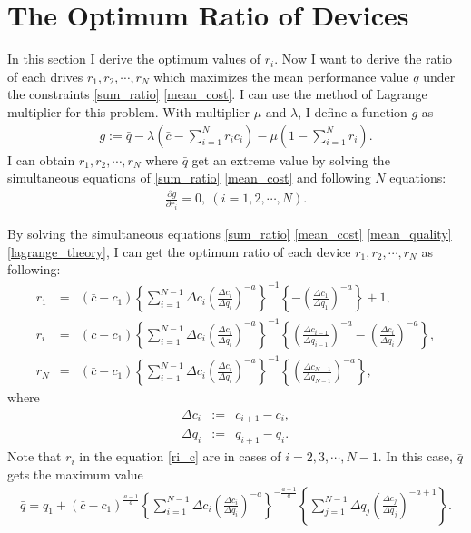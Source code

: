 \documentclass[a4paper,11pt]{article}
\begin{document}
\section{The Optimum Ratio of Devices}


In this section I derive the optimum values of $r_i$.
Now I want to derive the ratio of each drives $r_1, r_2, \cdots, r_N$
which maximizes the mean performance value $\bar{q}$ under the
constraints \eqref{sum_ratio} \eqref{mean_cost}.
I can use the method of Lagrange multiplier for this problem.
With multiplier $\mu$ and $\lambda$, I define a function $g$ as
\begin{eqnarray}
  g := \bar{q} - \lambda \left( \bar{c} - \sum_{i=1}^{N} r_i c_i \right)
  -\mu \left( 1- \sum_{i=1}^N r_i \right).
\end{eqnarray}
I can obtain $r_1, r_2, \cdots ,r_N$ where $\bar{q}$ get an extreme value
by solving the simultaneous equations of
\eqref{sum_ratio} \eqref{mean_cost} and following $N$ equations:
\begin{eqnarray}
  \frac{\partial g}{\partial r_i} = 0
    ,\ (i = 1, 2, \cdots , N).
    \label{lagrange_theory}
\end{eqnarray}


By solving the simultaneous equations \eqref{sum_ratio} \eqref{mean_cost}
\eqref{mean_quality} \eqref{lagrange_theory},
I can get the optimum ratio of each device $r_1,r_2,\cdots,r_N$ as
following:
\begin{eqnarray}
r_1&=&(\bar{c}-c_1)\left\{
  \sum_{i=1}^{N-1}\Delta c_i \left(\frac{\Delta c_i}{\Delta q_i}
  \right)^{-a}\right\}^{-1}
  \left\{
    -     \left(\frac{\Delta c_1}{\Delta q_1}
          \right)^{-a}
  \right\}+1, \label{r1_c}\\
r_i&=&(\bar{c}-c_1)\left\{
  \sum_{i=1}^{N-1}\Delta c_i \left(\frac{\Delta c_i}{\Delta q_i}
  \right)^{-a}\right\}^{-1}
  \left\{
          \left(\frac{\Delta c_{i-1}}{\Delta q_{i-1}}
          \right)^{-a}
    -     \left(\frac{\Delta c_i}{\Delta q_i}
          \right)^{-a}
  \right\}, \label{ri_c}\\
r_N&=&(\bar{c}-c_1)\left\{
  \sum_{i=1}^{N-1}\Delta c_i \left(\frac{\Delta c_i}{\Delta q_i}
  \right)^{-a}\right\}^{-1}
  \left\{
    \left(\frac{\Delta c_{N-1}}{\Delta q_{N-1}}
    \right)^{-a}
  \right\}, \label{rN_c}
\end{eqnarray}
where
\begin{eqnarray}
  \Delta c_i &:=& c_{i+1} - c_i, \\
  \Delta q_i &:=& q_{i+1} - q_i.
\end{eqnarray}
Note that $r_i$ in the equation \eqref{ri_c} are in cases of
$ i = 2, 3, \cdots, N-1 $.
In this case, $\bar{q}$ gets the maximum value
\begin{eqnarray}
\bar{q} = q_1 + \left(\bar{c}-c_1\right)^\frac{a-1}{a}
\left\{\sum_{i=1}^{N-1} \Delta c_i
  \left(\frac{\Delta c_i}{\Delta q_i}\right)^{-a}
  \right\}^{-\frac{a-1}{a}}
  \left\{\sum_{j=1}^{N-1}
  \Delta q_j  \left(\frac{\Delta c_j}{\Delta q_j}\right)^{-a+1}
\right\}.
\end{eqnarray}
\end{document}
